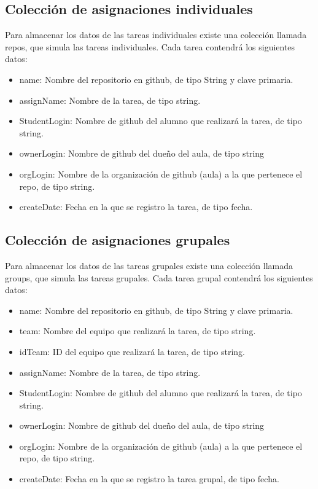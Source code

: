 \subsection{Colección de asignaciones individuales}
\label{3:4:4}

Para almacenar los datos de las tareas individuales existe una colección llamada repos, que simula las tareas individuales. Cada tarea contendrá los siguientes datos:

\begin{itemize}
  \item name: Nombre del repositorio en github, de tipo String y clave primaria.
  \item assignName: Nombre de la tarea, de tipo string.
  \item StudentLogin: Nombre de github del alumno que realizará la tarea, de tipo string.
  \item ownerLogin: Nombre de github del dueño del aula, de tipo string
  \item orgLogin: Nombre de la organización de github (aula) a la que pertenece el repo, de tipo string.
  \item createDate: Fecha en la que se registro la tarea, de tipo fecha.
\end{itemize}

\subsection{Colección de asignaciones grupales}
\label{3:4:5}

Para almacenar los datos de las tareas grupales existe una colección llamada groups, que simula las tareas grupales. Cada tarea grupal contendrá los siguientes datos:

\begin{itemize}
  \item name: Nombre del repositorio en github, de tipo String y clave primaria.
  \item team: Nombre del equipo que realizará la tarea, de tipo string.
  \item idTeam: ID del equipo que realizará la tarea, de tipo string.
  \item assignName: Nombre de la tarea, de tipo string.
  \item StudentLogin: Nombre de github del alumno que realizará la tarea, de tipo string.
  \item ownerLogin: Nombre de github del dueño del aula, de tipo string
  \item orgLogin: Nombre de la organización de github (aula) a la que pertenece el repo, de tipo string.
  \item createDate: Fecha en la que se registro la tarea grupal, de tipo fecha.
\end{itemize}

